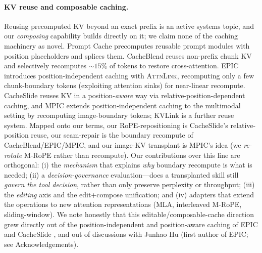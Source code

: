 \paragraph{KV reuse and composable caching.} Reusing precomputed KV beyond an exact prefix is an active
systems topic, and our \emph{composing} capability builds directly on it; we claim none of the caching
machinery as novel. Prompt Cache \citep{gim2024promptcache} precomputes reusable prompt modules with
position placeholders and splices them. CacheBlend \citep{yao2025cacheblend} reuses non-prefix chunk KV
and selectively recomputes ${\sim}15\%$ of tokens to restore cross-attention. EPIC
\citep{hu2025epic} introduces position-independent caching with \textsc{AttnLink}, recomputing only a few
chunk-boundary tokens (exploiting attention sinks) for near-linear recompute. CacheSlide
\citep{liu2026cacheslide} reuses KV in a position-\emph{aware} way via relative-position-dependent caching,
and MPIC \citep{mpic2025} extends position-independent caching to the multimodal setting by recomputing
image-boundary tokens; KVLink \citep{yang2025kvlink} is a further reuse system. Mapped onto our terms, our
RoPE-repositioning is CacheSlide's relative-position reuse, our seam-repair is the boundary recompute of
CacheBlend/EPIC/MPIC, and our image-KV transplant is MPIC's idea (we \emph{re-rotate} M-RoPE rather than
recompute). Our contributions over this line are orthogonal: (i) the \emph{mechanism} that explains
\emph{why} boundary recompute is what is needed; (ii) a \emph{decision-governance} evaluation---does a
transplanted skill still \emph{govern the tool decision}, rather than only preserve perplexity or
throughput; (iii) the \emph{editing} axis and the edit+compose unification; and (iv) adapters that extend the
operations to new attention representations (MLA, interleaved M-RoPE, sliding-window). We note honestly
that this editable/composable-cache direction grew directly out of the position-independent and
position-aware caching of EPIC and CacheSlide \citep{hu2025epic,liu2026cacheslide}, and out of discussions
with Junhao Hu (first author of EPIC; see Acknowledgements).

